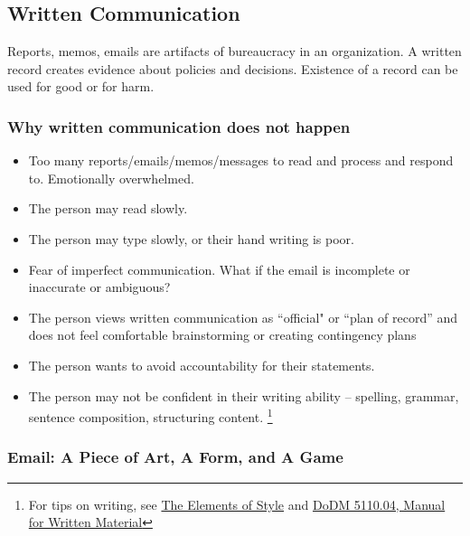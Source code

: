\subsection{Written Communication\label{sec:written-communication}}

Reports, memos, emails are artifacts of bureaucracy in an organization. A written record creates evidence about policies and decisions. Existence of a record can be used for good or for harm.







\subsubsection{Why written communication does not happen\label{sec:written-comm-does-not-happen}}
\begin{itemize}
    \item Too many reports/emails/memos/messages to read and process and respond to. Emotionally overwhelmed.
\item The person may read slowly.
\item The person may type slowly, or their hand writing is poor.
\item Fear of imperfect communication. What if the email is incomplete or inaccurate or ambiguous?
\item The person views written communication as ``official" or ``plan of record'' and does not feel comfortable brainstorming or creating contingency plans
\item The person wants to avoid accountability for their statements.
\item The person may not be confident in their writing ability -- spelling, grammar, sentence composition, structuring content. \footnote{For tips on writing, see 
\href{https://en.wikipedia.org/wiki/The_Elements_of_Style}{The Elements of Style}
and
\href{https://www.google.com/search?q=dodm+5110.04}{DoDM 5110.04, Manual for Written Material}}
\end{itemize}




\subsubsection{Email: A Piece of Art, A Form, and A Game\label{sec:art-form-game}}

